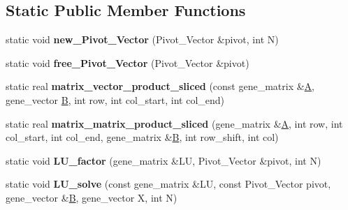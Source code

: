 \subsection*{Static Public Member Functions}
\begin{DoxyCompactItemize}
\item 
\mbox{\label{classblitz___l_u__solve__interface_adafba612b512655463cd9d1fa7239d8c}} 
static void {\bfseries new\+\_\+\+Pivot\+\_\+\+Vector} (Pivot\+\_\+\+Vector \&pivot, int N)
\item 
\mbox{\label{classblitz___l_u__solve__interface_ae58840dbbcb44f84500e26d0a212b219}} 
static void {\bfseries free\+\_\+\+Pivot\+\_\+\+Vector} (Pivot\+\_\+\+Vector \&pivot)
\item 
\mbox{\label{classblitz___l_u__solve__interface_a9ffd8f9541d9559c4b0f6d0532587e76}} 
static real {\bfseries matrix\+\_\+vector\+\_\+product\+\_\+sliced} (const gene\+\_\+matrix \&\hyperlink{group___core___module_class_eigen_1_1_matrix}{A}, gene\+\_\+vector \hyperlink{group___core___module_class_eigen_1_1_matrix}{B}, int row, int col\+\_\+start, int col\+\_\+end)
\item 
\mbox{\label{classblitz___l_u__solve__interface_afebfcffc1b05ad809cc704a0aa54a26e}} 
static real {\bfseries matrix\+\_\+matrix\+\_\+product\+\_\+sliced} (gene\+\_\+matrix \&\hyperlink{group___core___module_class_eigen_1_1_matrix}{A}, int row, int col\+\_\+start, int col\+\_\+end, gene\+\_\+matrix \&\hyperlink{group___core___module_class_eigen_1_1_matrix}{B}, int row\+\_\+shift, int col)
\item 
\mbox{\label{classblitz___l_u__solve__interface_a35ac67142990402c20597bf9a8d8d9b9}} 
static void {\bfseries L\+U\+\_\+factor} (gene\+\_\+matrix \&LU, Pivot\+\_\+\+Vector \&pivot, int N)
\item 
\mbox{\label{classblitz___l_u__solve__interface_acb9e0965fe92bb88c1b6d4e2a78906be}} 
static void {\bfseries L\+U\+\_\+solve} (const gene\+\_\+matrix \&LU, const Pivot\+\_\+\+Vector pivot, gene\+\_\+vector \&\hyperlink{group___core___module_class_eigen_1_1_matrix}{B}, gene\+\_\+vector X, int N)

\end{DoxyCompactItemize}

